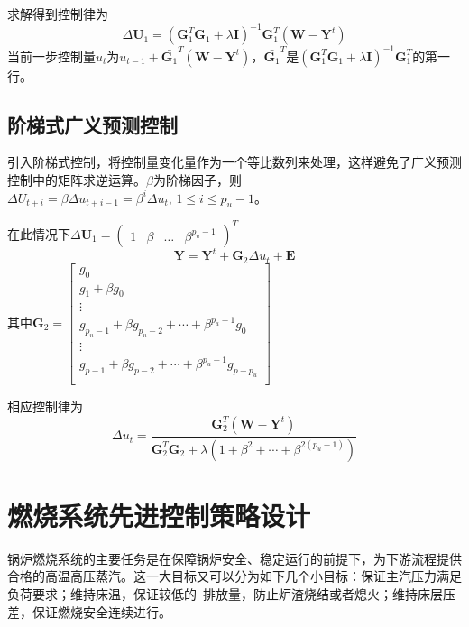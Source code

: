 求解得到控制律为
\begin{equation}
\Delta{\bm{U}_{1}} = (\bm{G}_{1}^{{T}}\bm{G}_{1}+\lambda{\bm{I}})^{-1}\bm{G}_{1}^{{T}}(\bm{W}-\bm{Y}^{t})
\end{equation}
当前一步控制量$u_t$为$u_{t-1}+\bar{\bm{G}_{1}}^{{T}}(\bm{W}-\bm{Y}^{t})$，$\bar{\bm{G}_{1}}^{{T}}$是$(\bm{G}_{1}^{{T}}\bm{G}_{1}+\lambda{\bm{I}})^{-1}\bm{G}_{1}^{{T}}$的第一行。

\subsection{阶梯式广义预测控制}
引入阶梯式控制，将控制量变化量作为一个等比数列来处理，这样避免了广义预测控制中的矩阵求逆运算\cite{吴刚1989预测控制研究及在工业锅炉控制中的应用}。$\beta$为阶梯因子，则$\Delta{U_{t+i}} = \beta\Delta{u_{t+i-1}} = \beta^{i}\Delta{u}_{t},\,1 \leq i \leq p_{u} - 1$。

在此情况下$\Delta{\bm{U}_{1}} = {\begin{pmatrix} 1 & \beta &\ldots & \beta^{p_{u}-1} \end{pmatrix}}^{T}$
\begin{equation}
\bm{Y} = \bm{Y}^{t} + \bm{G}_{2}\Delta{u_{t}} + \bm{E}
\end{equation}
其中$\bm{G}_{2} = \left[{\begin{array}{c}
g_{0} \\
g_{1} + \beta{g_{0}}\\
\vdots \\
g_{p_{u}-1} + \beta{g_{p_{u}-2}}+\cdots+\beta^{p_{u}-1}g_{0}\\
\vdots\\
g_{p-1} + \beta{g_{p-2}}+\cdots+\beta^{p_{u}-1}g_{p-p_{u}}\\
\end{array}}\right]$

相应控制律为
\begin{equation}
\Delta{u_{t}} = \frac{\bm{G}_{2}^{T}(\bm{W}-\bm{Y}^{t})}{\bm{G}_{2}^{T}\bm{G}_{2} + \lambda(1+\beta^{2} + \cdots+\beta^{2(p_{u}-1)})}
\end{equation}


\section{燃烧系统先进控制策略设计}
锅炉燃烧系统的主要任务是在保障锅炉安全、稳定运行的前提下，为下游流程提供合格的高温高压蒸汽。这一大目标又可以分为如下几个小目标：保证主汽压力满足负荷要求；维持床温，保证较低的~排放量，防止炉渣烧结或者熄火；维持床层压差，保证燃烧安全连续进行。

